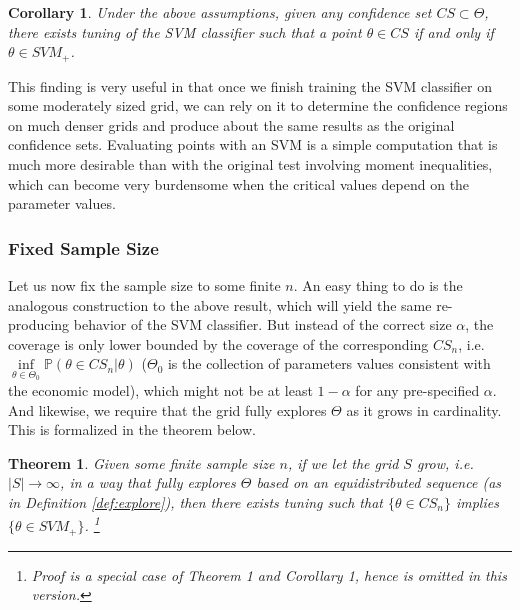 \documentclass[12pt]{article}
\newtheorem{theorem}{Theorem}
\newtheorem{corollary}{Corollary}
\theoremstyle{definition}
\begin{document}
\begin{corollary}\label{corollary1}
Under the above assumptions, given any confidence set $CS\subset\Theta$, there exists tuning of the SVM classifier such that a point $\theta\in CS$ if and only if $\theta\in SVM_+$.
\end{corollary}

This finding is very useful in that once we finish training the SVM classifier on some moderately sized grid, we can rely on it to determine the confidence regions on much denser grids and produce about the same results as the original confidence sets. Evaluating points with an SVM is a simple computation that is much more desirable than with the original test involving moment inequalities, which can become very burdensome when the critical values depend on the parameter values.


\subsubsection{Fixed Sample Size}
Let us now fix the sample size to some finite $n$. An easy thing to do is the analogous construction to the above result, which will yield the same re-producing behavior of the SVM classifier. But instead of the correct size $\alpha$, the coverage is only lower bounded by the coverage of the corresponding $CS_n$, i.e. $\underset{\theta\in\Theta_0}{\inf}\mathbb{P}(\theta\in CS_n|\theta)$ ($\Theta_0$ is the collection of parameters values consistent with the economic model), which might not be at least $1-\alpha$ for any pre-specified $\alpha$. And likewise, we require that the grid fully explores $\Theta$ as it grows in cardinality. This is formalized in the theorem below.

\begin{theorem}
Given some finite sample size $n$, if we let the grid $S$ grow, i.e. $|S|\to\infty$, in a way that fully explores $\Theta$ based on an equidistributed sequence (as in Definition \ref{def:explore}), then there exists tuning such that $\{\theta\in CS_n\}$ implies $\{\theta\in SVM_+\}$. \footnote{Proof is a special case of Theorem 1 and Corollary 1, hence is omitted in this version.}
\end{theorem}
\end{document}
